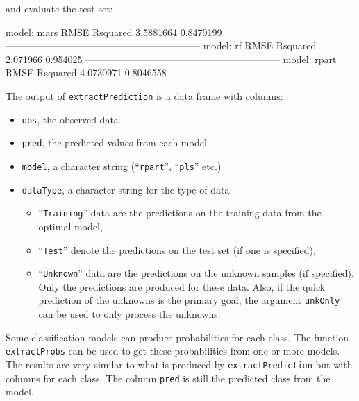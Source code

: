 \documentclass[12pt]{article}
\begin{document}
\noindent and evaluate the test set:

\begin{small}
\begin{Schunk}
\begin{Soutput}
model: mars
     RMSE  Rsquared 
3.5881664 0.8479199 
------------------------------------------------------------ 
model: rf
    RMSE Rsquared 
2.071966 0.954025 
------------------------------------------------------------ 
model: rpart
     RMSE  Rsquared 
4.0730971 0.8046558 
\end{Soutput}
\end{Schunk}
\end{small}

The output of \texttt{extractPrediction} is a data frame with columns:
   \begin{itemize}   
      \item \texttt{obs}, the observed data
      \item \texttt{pred}, the predicted values from each model
      \item \texttt{model}, a character string (``\texttt{rpart}'', ``\texttt{pls}'' etc.)
      \item \texttt{dataType}, a character string for the type of data:
      \begin{itemize}
         \item ``\texttt{Training}'' data are the predictions on the training data from
            the optimal model,
         \item ``\texttt{Test}'' denote the predictions on the test set (if one is specified),
         \item ``\texttt{Unknown}'' data are the predictions on the unknown samples (if specified). 
         Only the predictions are produced for these data. Also, if the quick prediction of the unknowns
         is the primary goal, the argument \texttt{unkOnly} can be used to only process the unknowns.
      \end{itemize}
   \end{itemize}      

Some classification models can produce probabilities for each class. The function \texttt{extractProbs} can be used to get these probabilities from one or more models. The results are very similar to what is produced by \texttt{extractPrediction} but with columns for each class. The column \texttt{pred} is still the predicted class from the model. 
\end{document}
